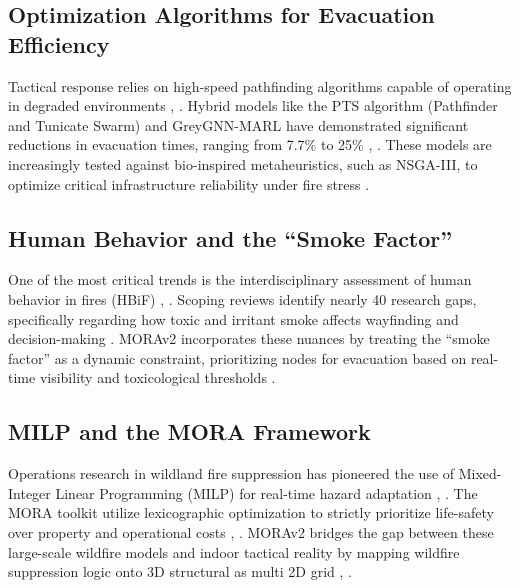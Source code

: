 \subsection{Optimization Algorithms for Evacuation Efficiency}
Tactical response relies on high-speed pathfinding algorithms capable of operating in degraded environments \cite{Chen2025}, \cite{Guo2025}. 
Hybrid models like the PTS algorithm (Pathfinder and Tunicate Swarm) and GreyGNN-MARL 
have demonstrated significant reductions in evacuation times, ranging from 7.7\% to 25\% \cite{Chen2025}, \cite{GrandaChico2025}. 
These models are increasingly tested against bio-inspired metaheuristics, such as NSGA-III, 
to optimize critical infrastructure reliability under fire stress \cite{Guo2025}.


\subsection{Human Behavior and the ``Smoke Factor''}
One of the most critical trends is the interdisciplinary assessment of human behavior in fires (HBiF) \cite{Kinkel2025}, \cite{Fisher2024}. 
Scoping reviews identify nearly 40 research gaps, specifically regarding how toxic and irritant smoke affects wayfinding and decision-making 
\cite{Kinkel2025}. MORAv2 incorporates these nuances by treating the ``smoke factor'' as a dynamic constraint, 
prioritizing nodes for evacuation based on real-time visibility and toxicological thresholds \cite{Hurst2026}.

\subsection{MILP and the MORA Framework}
Operations research in wildland fire suppression has pioneered the use of Mixed-Integer Linear Programming (MILP) for real-time hazard adaptation 
\cite{GrandaChico2025}, \cite{Orphanoudakis2025}. The MORA toolkit utilize lexicographic optimization to 
strictly prioritize life-safety over property and operational costs \cite{Orphanoudakis2025}, \cite{Ontario_Fire_Group_2024}. 
MORAv2 bridges the gap between these large-scale wildfire models and indoor tactical reality by 
mapping wildfire suppression logic onto 3D structural as multi 2D grid \cite{Orphanoudakis2025}, \cite{Chen2025}.